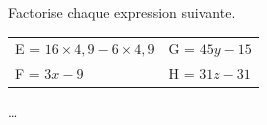 \begin{exercice*}
    Factorise chaque expression suivante.

    \begin{tabular}{ll}
        E = $16 \times 4,9 - 6 \times 4,9$ & G = $45y - 15$ \\
        F = $3x - 9$ & H = $31z - 31$
    \end{tabular}
\end{exercice*}
\begin{corrige}
    \dots
\end{corrige}

